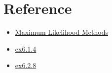 \section{Reference}
\begin{itemize}
    \item \href{https://www.stat.purdue.edu/~tlzhang/stat517/chapter6_517.pdf}{Maximum Likelihood Methods}
    \item \href{https://tomoki-okuno.com/files/math/Ch6_sol.pdf}{ex6.1.4}
    \item \href{https://tomoki-okuno.com/files/math/Ch6_sol.pdf}{ex6.2.8}
\end{itemize}